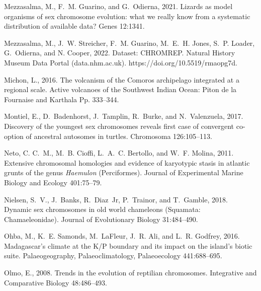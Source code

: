 \documentclass[a4paper, 12pt]{article}
\begin{document}
\begin{thebibliography}{73}
Mezzasalma, M., F.~M. Guarino, and G.~Odierna, 2021.
\newblock Lizards as model organisms of sex chromosome evolution: what we
  really know from a systematic distribution of available data?
\newblock Genes 12:1341.

\bibitem[Mezzasalma et~al.(2022)Mezzasalma, Streicher, Guarino, Jones, Loader, Odierna, and Cooper}]{chameleon-data}
Mezzasalma, M., J.~W. Streicher, F.~M. Guarino, M.~E.~H. Jones, S.~P. Loader, G.~Odierna, and N. Cooper, 2022.
\newblock Dataset: CHROMREP. Natural History Museum Data Portal (data.nhm.ac.uk). https://doi.org/10.5519/rmaopg7d.

Michon, L., 2016.
\newblock The volcanism of the {C}omoros archipelago integrated at a regional
  scale.
\newblock Active volcanoes of the Southwest Indian Ocean: Piton de la Fournaise
  and Karthala Pp. 333--344.

Montiel, E., D.~Badenhorst, J.~Tamplin, R.~Burke, and N.~Valenzuela, 2017.
\newblock Discovery of the youngest sex chromosomes reveals first case of
  convergent co-option of ancestral autosomes in turtles.
\newblock Chromosoma 126:105--113.

Neto, C. C.~M., M.~B. Cioffi, L.~A.~C. Bertollo, and W.~F. Molina, 2011.
\newblock Extensive chromosomal homologies and evidence of karyotypic stasis in
  atlantic grunts of the genus \textit{Haemulon} ({P}erciformes).
\newblock Journal of Experimental Marine Biology and Ecology 401:75--79.

Nielsen, S.~V., J.~Banks, R.~Diaz~Jr, P.~Trainor, and T.~Gamble, 2018.
\newblock Dynamic sex chromosomes in old world chameleons ({S}quamata:
  {C}hamaeleonidae).
\newblock Journal of Evolutionary Biology 31:484--490.

Ohba, M., K.~E. Samonds, M.~LaFleur, J.~R. Ali, and L.~R. Godfrey, 2016.
\newblock Madagascar's climate at the {K}/{P} boundary and its impact on the
  island's biotic suite.
\newblock Palaeogeography, Palaeoclimatology, Palaeoecology 441:688--695.

Olmo, E., 2008.
\newblock Trends in the evolution of reptilian chromosomes.
\newblock Integrative and Comparative Biology 48:486--493.


\end{thebibliography}
\end{document}
